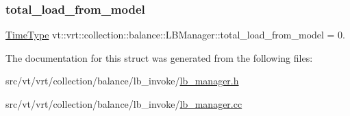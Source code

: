 \mbox{\label{structvt_1_1vrt_1_1collection_1_1balance_1_1_l_b_manager_a7f6bcfd7992bcf0ec01dcb8ed5e0a789}} 
\subsubsection{\texorpdfstring{total\+\_\+load\+\_\+from\+\_\+model}{total\_load\_from\_model}}
{\footnotesize\ttfamily \hyperlink{namespacevt_a876a9d0cd5a952859c72de8a46881442}{Time\+Type} vt\+::vrt\+::collection\+::balance\+::\+L\+B\+Manager\+::total\+\_\+load\+\_\+from\+\_\+model = 0.\hspace{0.3cm}{\ttfamily [private]}}



The documentation for this struct was generated from the following files\+:\begin{DoxyCompactItemize}
\item 
src/vt/vrt/collection/balance/lb\+\_\+invoke/\hyperlink{lb__manager_8h}{lb\+\_\+manager.\+h}\item 
src/vt/vrt/collection/balance/lb\+\_\+invoke/\hyperlink{lb__manager_8cc}{lb\+\_\+manager.\+cc}\end{DoxyCompactItemize}
